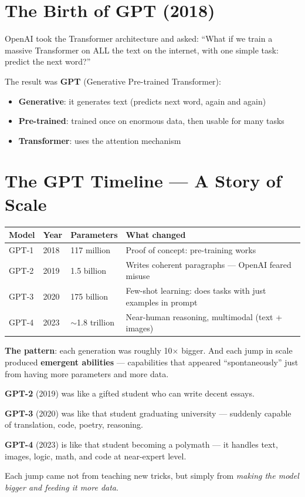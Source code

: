 \documentclass[11pt,a4paper]{report}
\begin{document}
\section{The Birth of GPT (2018)}

OpenAI took the Transformer architecture and asked: ``What if we train a massive Transformer on ALL the text on the internet, with one simple task: predict the next word?''

The result was \textbf{GPT} (Generative Pre-trained Transformer):
\begin{itemize}
    \item \textbf{Generative}: it generates text (predicts next word, again and again)
    \item \textbf{Pre-trained}: trained once on enormous data, then usable for many tasks
    \item \textbf{Transformer}: uses the attention mechanism
\end{itemize}

\section{The GPT Timeline --- A Story of Scale}

\begin{table}[h]
\centering
\begin{tabularx}{\textwidth}{l l X X}
\toprule
\textbf{Model} & \textbf{Year} & \textbf{Parameters} & \textbf{What changed} \\
\midrule
GPT-1 & 2018 & 117 million & Proof of concept: pre-training works \\
GPT-2 & 2019 & 1.5 billion & Writes coherent paragraphs --- OpenAI feared misuse \\
GPT-3 & 2020 & 175 billion & Few-shot learning: does tasks with just examples in prompt \\
GPT-4 & 2023 & $\sim$1.8 trillion & Near-human reasoning, multimodal (text + images) \\
\bottomrule
\end{tabularx}
\end{table}

\textbf{The pattern}: each generation was roughly 10$\times$ bigger. And each jump in scale produced \textbf{emergent abilities} --- capabilities that appeared ``spontaneously'' just from having more parameters and more data.

\begin{analogybox}
\textbf{GPT-2} (2019) was like a gifted student who can write decent essays.

\textbf{GPT-3} (2020) was like that student graduating university --- suddenly capable of translation, code, poetry, reasoning.

\textbf{GPT-4} (2023) is like that student becoming a polymath --- it handles text, images, logic, math, and code at near-expert level.

Each jump came not from teaching new tricks, but simply from \textit{making the model bigger and feeding it more data}.
\end{analogybox}
\end{document}
